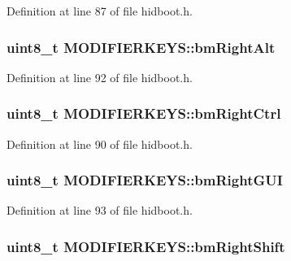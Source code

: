 \-Definition at line 87 of file hidboot.\-h.

\hypertarget{struct_m_o_d_i_f_i_e_r_k_e_y_s_af4c772b51ef8ed4ec9863c4247f395c2}{
\subsubsection[{bm\-Right\-Alt}]{\setlength{\rightskip}{0pt plus 5cm}uint8\-\_\-t {\bf \-M\-O\-D\-I\-F\-I\-E\-R\-K\-E\-Y\-S\-::bm\-Right\-Alt}}}\label{struct_m_o_d_i_f_i_e_r_k_e_y_s_af4c772b51ef8ed4ec9863c4247f395c2}


\-Definition at line 92 of file hidboot.\-h.

\hypertarget{struct_m_o_d_i_f_i_e_r_k_e_y_s_a8926773a958c27b996966489ecdf0da8}{
\subsubsection[{bm\-Right\-Ctrl}]{\setlength{\rightskip}{0pt plus 5cm}uint8\-\_\-t {\bf \-M\-O\-D\-I\-F\-I\-E\-R\-K\-E\-Y\-S\-::bm\-Right\-Ctrl}}}\label{struct_m_o_d_i_f_i_e_r_k_e_y_s_a8926773a958c27b996966489ecdf0da8}


\-Definition at line 90 of file hidboot.\-h.

\hypertarget{struct_m_o_d_i_f_i_e_r_k_e_y_s_a018fb06ba6da4b802895e6a945f8d041}{
\subsubsection[{bm\-Right\-G\-U\-I}]{\setlength{\rightskip}{0pt plus 5cm}uint8\-\_\-t {\bf \-M\-O\-D\-I\-F\-I\-E\-R\-K\-E\-Y\-S\-::bm\-Right\-G\-U\-I}}}\label{struct_m_o_d_i_f_i_e_r_k_e_y_s_a018fb06ba6da4b802895e6a945f8d041}


\-Definition at line 93 of file hidboot.\-h.

\hypertarget{struct_m_o_d_i_f_i_e_r_k_e_y_s_ac6d2815eff37e625d1bd702b4712f4b3}{
\subsubsection[{bm\-Right\-Shift}]{\setlength{\rightskip}{0pt plus 5cm}uint8\-\_\-t {\bf \-M\-O\-D\-I\-F\-I\-E\-R\-K\-E\-Y\-S\-::bm\-Right\-Shift}}}\label{struct_m_o_d_i_f_i_e_r_k_e_y_s_ac6d2815eff37e625d1bd702b4712f4b3}


